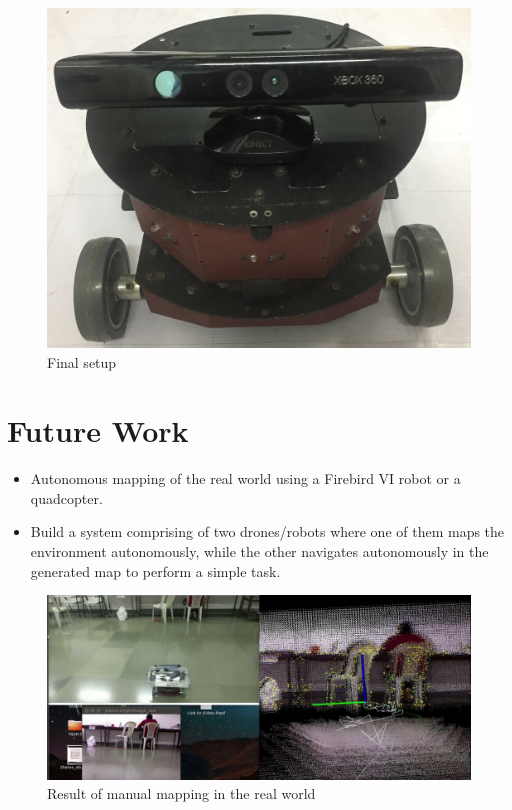 \documentclass[a4paper,12pt,oneside]{book}
\begin{document}
\begin{figure}[h]
	\centering
	\includegraphics[scale=0.08]{bot}
	\caption{Final setup}
\end{figure}

\section{Future Work}
	\begin{itemize}
		\item Autonomous mapping of the real world using a Firebird VI robot or a quadcopter.
		\item Build a system comprising of two drones/robots where one of them maps the environment autonomously, while the other navigates autonomously in the generated map to perform a simple task.
	\end{itemize}

\begin{figure}[h]
	\centering
	\includegraphics[scale=0.4]{botmap}
	\caption{Result of manual mapping in the real world}
\end{figure}
\end{document}
